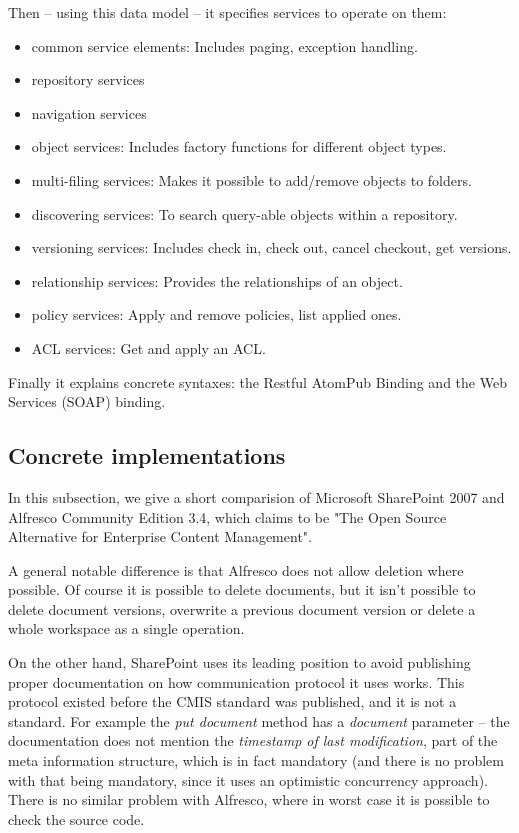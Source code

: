 Then -- using this data model -- it specifies services to operate on them:

\begin{itemize}
\item common service elements: Includes paging, exception handling.
\item repository services
\item navigation services
\item object services: Includes factory functions for different object types.
\item multi-filing services: Makes it possible to add/remove objects to folders.
\item discovering services: To search query-able objects within a repository.
\item versioning services: Includes check in, check out, cancel checkout, get
	versions.
\item relationship services: Provides the relationships of an object.
\item policy services: Apply and remove policies, list applied ones.
\item ACL services: Get and apply an ACL.
\end{itemize}

Finally it explains concrete syntaxes: the Restful AtomPub Binding and the Web
Services (SOAP) binding.

\subsection{Concrete implementations}

In this subsection, we give a short comparision of Microsoft SharePoint 2007 and
Alfresco Community Edition 3.4, which claims to be "The Open Source Alternative
for Enterprise Content Management".

A general notable difference is that Alfresco does not allow deletion where
possible. Of course it is possible to delete documents, but it isn't possible
to delete document versions, overwrite a previous document version or delete a
whole workspace as a single operation.

On the other hand, SharePoint uses its leading position to avoid publishing
proper documentation on how communication protocol it uses works. This protocol
existed before the CMIS standard was published, and it is not a standard. For
example the \emph{put document} method has a \emph{document} parameter -- the
documentation \cite{spdoc} does not mention the \emph{timestamp of last
modification}, part of the meta information structure, which is in fact
mandatory (and there is no problem with that being mandatory, since it uses an
optimistic concurrency approach). There is no similar problem with Alfresco,
where in worst case it is possible to check the source code.


